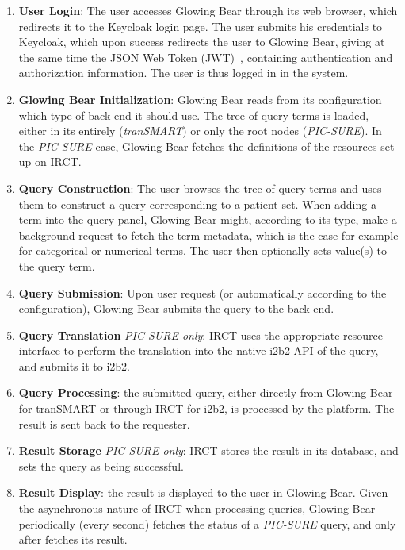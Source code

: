 \begin{enumerate}
\item \label{enum:wf-interop-login}\textbf{User Login}:
The user accesses Glowing Bear through its web browser, which redirects it to the Keycloak login page.
The user submits his credentials to Keycloak, which upon success redirects the user to Glowing Bear, giving at the same time the JSON Web Token (JWT)~\cite{todo}, containing authentication and authorization information.
The user is thus logged in in the system.

\item \label{enum:wf-interop-init} \textbf{Glowing Bear Initialization}:
Glowing Bear reads from its configuration which type of back end it should use.
The tree of query terms is loaded, either in its entirely (\textit{tranSMART}) or only the root nodes (\textit{PIC-SURE}).
In the \textit{PIC-SURE} case, Glowing Bear fetches the definitions of the resources set up on IRCT.

\item \textbf{Query Construction}:
The user browses the tree of query terms and uses them to construct a query corresponding to a patient set.
When adding a term into the query panel, Glowing Bear might, according to its type, make a background request to fetch the term metadata, which is the case for example for categorical or numerical terms.
The user then optionally sets value(s) to the query term.

\item \textbf{Query Submission}:
Upon user request (or automatically according to the configuration), Glowing Bear submits the query to the back end.

\item \textbf{Query Translation} \textit{PIC-SURE only}: IRCT uses the appropriate resource interface to perform the translation into the native i2b2 API of the query, and submits it to i2b2.

\item \textbf{Query Processing}: the submitted query, either directly from Glowing Bear for tranSMART or through IRCT for i2b2, is processed by the platform. 
The result is sent back to the requester.

\item \textbf{Result Storage} \textit{PIC-SURE only}: IRCT stores the result in its database, and sets the query as being successful.

\item \textbf{Result Display}: the result is displayed to the user in Glowing Bear.
Given the asynchronous nature of IRCT when processing queries, Glowing Bear periodically (every second) fetches the status of a \textit{PIC-SURE} query, and only after fetches its result.

\end{enumerate}


